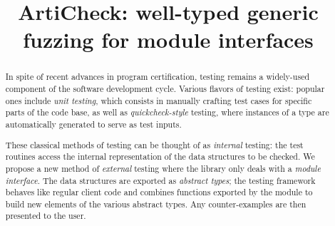 \documentclass[nonatbib]{sigplanconf}
\newcommand{\arti}{\textsf{ArtiCheck}\xspace}
\begin{document}
\setlength{\pdfpageheight}{\paperheight}
\setlength{\pdfpagewidth}{\paperwidth}

\exclusivelicense


\title{\arti: well-typed generic fuzzing for module interfaces}


\maketitle

\begin{abstract}
  In spite of recent advances in program certification, testing remains a
  widely-used component of the software development cycle. Various flavors of
  testing exist: popular ones include \emph{unit testing}, which consists in
  manually crafting test cases for specific parts of the code base, as well as
  \emph{quickcheck-style} testing, where instances of a type are automatically
  generated to serve as test inputs.

  These classical methods of testing can be thought of as \emph{internal}
  testing: the test routines access the internal representation of the data
  structures to be checked. We propose a new method of \emph{external}
  testing where the library only deals with a \emph{module interface}. The data
  structures are exported as \emph{abstract types}; the testing framework
  behaves like regular client code and combines functions exported by the
  module to build new elements of the various abstract types. Any counter-examples
  are then presented to the user.
\end{abstract}













\end{document}

